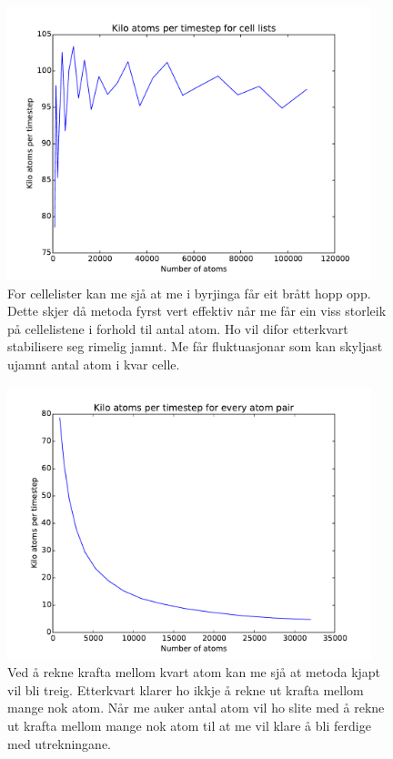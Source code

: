 \documentclass[12pt, a4paper]{article}
\theoremstyle{definition} \newtheorem*{definition}{Teorem}
\begin{document}
        \begin{figure}[H]
            \centering
            \includegraphics[width=400px]{cellLists.pdf}
            \caption{For cellelister kan me sjå at me i byrjinga får eit brått hopp opp. Dette skjer då metoda fyrst vert effektiv når me får ein viss storleik på cellelistene
                     i forhold til antal atom. Ho vil difor etterkvart stabilisere seg rimelig jamnt. Me får fluktuasjonar som kan skyljast ujamnt antal atom i kvar celle.}
        \end{figure}
        \begin{figure}[H]
            \centering
            \includegraphics[width=400px]{oldForce.pdf}
            \caption{Ved å rekne krafta mellom kvart atom kan me sjå at metoda kjapt vil bli treig. Etterkvart klarer ho ikkje å rekne ut krafta mellom mange nok atom. Når me auker
                     antal atom vil ho slite med å rekne ut krafta mellom mange nok atom til at me vil klare å bli ferdige med utrekningane.}
        \end{figure}
\end{document}
